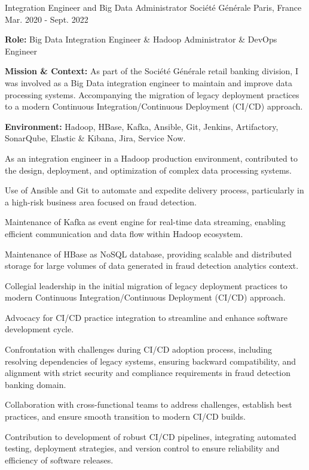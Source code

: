 \begin{cventries}
\cventry
{Integration Engineer and Big Data Administrator} %
{Société Générale} %
{Paris, France} %
{Mar. 2020 - Sept. 2022} %
{
  \begin{cvitems} %
    \item {\textbf{Role:} Big Data Integration Engineer \& Hadoop Administrator \& DevOps Engineer}
    \item {\textbf{Mission \& Context:} As part of the Société Générale retail banking division, I was involved as a Big Data integration engineer to maintain and improve data processing systems. Accompanying the migration of legacy deployment practices to a modern Continuous Integration/Continuous Deployment (CI/CD) approach.}
    \item {\textbf{Environment:} Hadoop, HBase, Kafka, Ansible, Git, Jenkins, Artifactory, SonarQube, Elastic \& Kibana, Jira, Service Now.}
    \item {As an integration engineer in a Hadoop production environment, contributed to the design, deployment, and optimization of complex data processing systems.}
    \item {Use of Ansible and Git to automate and expedite delivery process, particularly in a high-risk business area focused on fraud detection.}
    \item {Maintenance of Kafka as event engine for real-time data streaming, enabling efficient communication and data flow within Hadoop ecosystem.}
    \item {Maintenance of HBase as NoSQL database, providing scalable and distributed storage for large volumes of data generated in fraud detection analytics context.}
    \item {Collegial leadership in the initial migration of legacy deployment practices to modern Continuous Integration/Continuous Deployment (CI/CD) approach.}
    \item {Advocacy for CI/CD practice integration to streamline and enhance software development cycle.}
    \item {Confrontation with challenges during CI/CD adoption process, including resolving dependencies of legacy systems, ensuring backward compatibility, and alignment with strict security and compliance requirements in fraud detection banking domain.}
    \item {Collaboration with cross-functional teams to address challenges, establish best practices, and ensure smooth transition to modern CI/CD builds.}
    \item {Contribution to development of robust CI/CD pipelines, integrating automated testing, deployment strategies, and version control to ensure reliability and efficiency of software releases.}
  \end{cvitems}  
}

\end{cventries}
